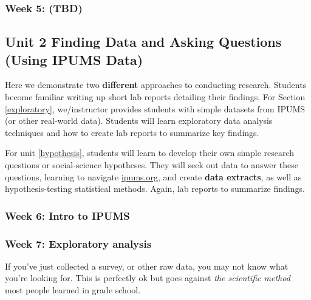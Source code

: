 \documentclass[
]{book}
\begin{document}
\hypertarget{week-5-tbd}{%
\subsubsection*{Week 5: (TBD)}\label{week-5-tbd}}

\hypertarget{unit-2-finding-data-and-asking-questions-using-ipums-data}{%
\subsection*{Unit 2 Finding Data and Asking Questions (Using IPUMS Data)}\label{unit-2-finding-data-and-asking-questions-using-ipums-data}}

Here we demonstrate two \textbf{different} approaches to conducting research. Students become familiar writing up short lab reports detailing their findings. For Section \ref{exploratory}, we/instructor provides students with simple datasets from IPUMS (or other real-world data). Students will learn exploratory data analysis techniques and how to create lab reports to summarize key findings.

For unit \ref{hypothesis}, students will learn to develop their own simple research questions or social-science hypotheses. They will seek out data to answer these questions, learning to navigate \href{https://ipums.org}{ipums.org}, and create \textbf{data extracts}, as well as hypothesis-testing statistical methods. Again, lab reports to summarize findings.

\hypertarget{week-6-intro-to-ipums}{%
\subsubsection{Week 6: Intro to IPUMS}\label{week-6-intro-to-ipums}}

\hypertarget{week-7-exploratory-analysis}{%
\subsubsection*{Week 7: Exploratory analysis}\label{week-7-exploratory-analysis}}

If you've just collected a survey, or other raw data, you may not know what you're looking for. This is perfectly ok but goes against \emph{the scientific method} most people learned in grade school.
\end{document}
